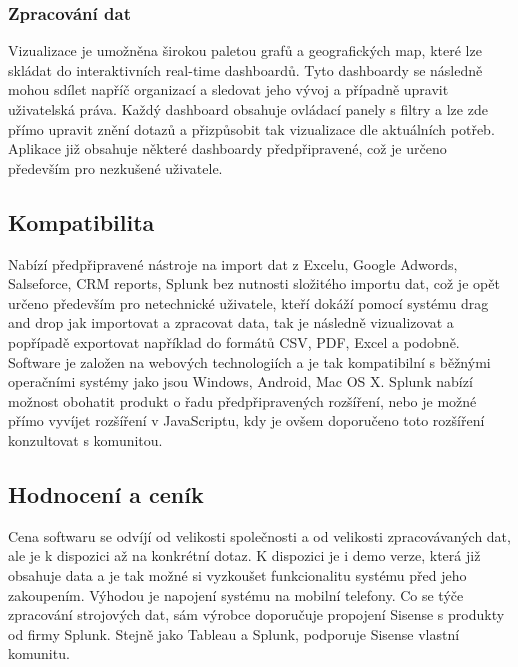 \documentclass[czech,BP]{thesiskiv}
\begin{document}
 \subsubsection{Zpracování dat}
 Vizualizace je umožněna širokou paletou grafů a geografických map, které lze skládat do interaktivních real-time dashboardů. Tyto dashboardy se následně mohou sdílet napříč organizací a sledovat jeho vývoj a případně upravit uživatelská práva. Každý dashboard obsahuje ovládací panely s filtry a lze zde přímo upravit znění dotazů a přizpůsobit tak vizualizace dle aktuálních potřeb. Aplikace již obsahuje některé dashboardy předpřipravené, což je určeno především pro nezkušené uživatele.\cite{SisenseVizualize}
 		
 \subsection{Kompatibilita}
  Nabízí předpřipravené nástroje na import dat z Excelu, Google Adwords, Salseforce, CRM reports, Splunk bez nutnosti složitého importu dat, což je opět určeno především pro netechnické uživatele, kteří dokáží pomocí systému drag and drop jak importovat a zpracovat data, tak je následně vizualizovat a popřípadě exportovat například do formátů CSV, PDF, Excel a podobně. Software je založen na webových technologiích a je tak kompatibilní s běžnými operačními systémy jako jsou Windows, Android, Mac OS X. Splunk nabízí možnost obohatit produkt o řadu předpřipravených rozšíření, nebo je možné  přímo vyvíjet rozšíření v JavaScriptu, kdy je ovšem doporučeno toto rozšíření konzultovat s komunitou.\cite{SisenseAdd-ons}
 \subsection{Hodnocení a ceník}
 Cena softwaru se odvíjí od  velikosti společnosti a od velikosti zpracovávaných dat, ale je k dispozici až na konkrétní dotaz. K dispozici je i demo verze, která již obsahuje data a je tak možné si vyzkoušet funkcionalitu systému před jeho zakoupením. Výhodou je napojení systému na mobilní telefony. Co se týče zpracování strojových dat, sám výrobce doporučuje propojení Sisense s produkty od firmy Splunk. Stejně jako Tableau a Splunk, podporuje Sisense vlastní komunitu.\cite{SisenseAndSplunk}
 
 
 
\end{document}
